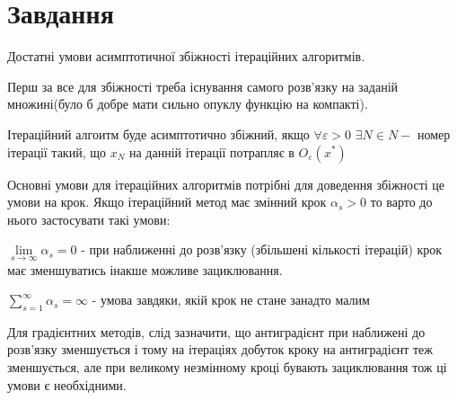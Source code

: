 
\chapter{Завдання \theHchapter}

\begin{tcolorbox}[title=Завдання 13]
    Достатні умови асимптотичної збіжності ітераційних алгоритмів.
\end{tcolorbox}


Перш за все для збіжності треба існування самого розв'язку на заданій 
множині(було б добре мати сильно опуклу функцію на компакті).

Ітераційний алгоитм буде асимптотично збіжний, якщо $\forall \varepsilon >0$
$\exists N \in N - $ номер ітерації такий, що $x_N$ на данній ітерації 
потрапляє в $O_{\varepsilon}(x^*)$


Основні умови для ітераційних алгоритмів потрібні для доведення збіжності 
це умови на крок.
Якщо ітераційний метод має змінний крок $\alpha_s > 0$ то варто 
до нього застосувати такі умови:


$\lim\limits_{s \rightarrow \infty}\alpha_s = 0$ - при наближенні 
до розв'язку (збільшені кількості ітерацій) крок має зменшуватись 
інакше можливе зациклювання.


$\sum\limits_{s = 1}^{\infty} \alpha_s = \infty$ - умова завдяки, якій крок 
не стане занадто малим 


Для градієнтних методів, слід зазначити, що антиградієнт при наближені 
до розв'язку зменшується і тому на ітераціях добуток кроку на антиградієнт 
теж зменшується, але при великому незмінному кроці бувають зациклювання 
тож ці умови є необхідними.
